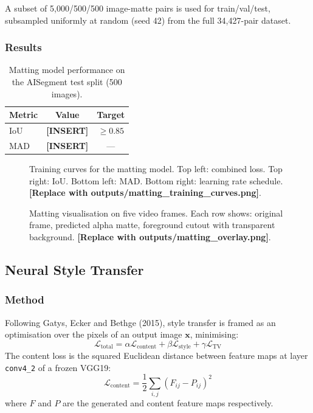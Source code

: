 \documentclass[11pt,a4paper]{article}
\begin{document}
A subset of 5,000/500/500 image-matte pairs is used for train/val/test,
subsampled uniformly at random (seed 42) from the full 34,427-pair dataset.

\subsubsection{Results}

\begin{table}[h]
\centering
\caption{Matting model performance on the AISegment test split (500 images).}
\begin{tabular}{lcc}
\toprule
Metric & Value & Target \\
\midrule
IoU  & \textbf{[INSERT]} & $\geq 0.85$ \\
MAD  & \textbf{[INSERT]} & --- \\
\bottomrule
\end{tabular}
\end{table}

\begin{figure}[h]
\centering
\fbox{\rule{0pt}{4.5cm}\rule{\linewidth}{0pt}}
\caption{Training curves for the matting model. Top left: combined loss. Top right: IoU.
Bottom left: MAD. Bottom right: learning rate schedule. \textbf{[Replace with
outputs/matting\_training\_curves.png]}.}
\label{fig:matting_curves}
\end{figure}

\begin{figure}[h]
\centering
\fbox{\rule{0pt}{4cm}\rule{\linewidth}{0pt}}
\caption{Matting visualisation on five video frames. Each row shows: original frame,
predicted alpha matte, foreground cutout with transparent background.
\textbf{[Replace with outputs/matting\_overlay.png]}.}
\label{fig:matting_overlay}
\end{figure}

\subsection{Neural Style Transfer}

\subsubsection{Method}

Following Gatys, Ecker and Bethge (2015), style transfer is framed as an optimisation
over the pixels of an output image $\mathbf{x}$, minimising:
\begin{equation}
  \mathcal{L}_{\text{total}} = \alpha \mathcal{L}_{\text{content}} +
                                \beta  \mathcal{L}_{\text{style}} +
                                \gamma \mathcal{L}_{\text{TV}}
\end{equation}
The content loss is the squared Euclidean distance between feature maps at layer
\texttt{conv4\_2} of a frozen VGG19:
\begin{equation}
  \mathcal{L}_{\text{content}} = \frac{1}{2}\sum_{i,j}(F_{ij} - P_{ij})^2
\end{equation}
where $F$ and $P$ are the generated and content feature maps respectively.
\end{document}
